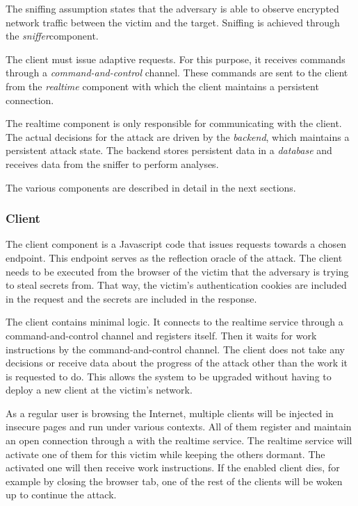 \documentclass[conference, letterpaper, 10pt]{IEEEtran}
\begin{document}
The sniffing assumption states that the adversary is able to observe encrypted network
traffic between the victim and the target.
Sniffing is achieved through the \textit{sniffer}component.

The client must issue adaptive requests. For this purpose, it receives commands
through a \textit{command-and-control} channel. These commands are sent to the
client from the \textit{realtime} component with which the client maintains a
persistent connection.

The realtime component is only responsible for communicating with the client.
The actual decisions for the attack are driven by the \textit{backend}, which
maintains a persistent attack state. The backend stores persistent data in a
\textit{database} and receives data from the sniffer to perform analyses.

The various components are described in detail in the next sections.

\subsubsection{Client}

The client component is a Javascript code that issues requests towards a chosen
endpoint. This endpoint serves as the reflection oracle of the attack. The client
needs to be executed from the browser of the victim that the adversary is trying
to steal secrets from. That way, the victim's authentication cookies are
included in the request and the secrets are included in the
response.

The client contains minimal logic. It connects to the realtime service through
a command-and-control channel and registers itself. Then it waits
for work instructions by the command-and-control channel. The
client does not take any decisions or receive data about the progress of the
attack other than the work it is requested to do.
This allows the system to be upgraded without having to deploy a
new client at the victim's network.

As a regular user is browsing the Internet, multiple clients will be
injected in insecure pages and run under various contexts. All of
them register and maintain an open connection through a
with the realtime service. The realtime
service will activate one of them for this victim while keeping the others
dormant. The activated one will then receive work instructions. If the enabled
client dies, for example by closing the browser
tab, one of the rest of the clients will be woken up to continue the
attack.
\end{document}
